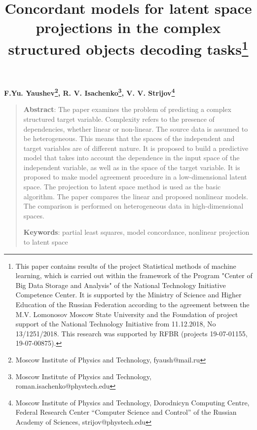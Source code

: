 \documentclass[12pt]{article}
\begin{document}
 
\title{Concordant models for latent space projections in the complex structured objects decoding tasks\thanks{This paper contains results of the project Statistical methods of machine learning, which is carried out within the framework of the Program "Center of Big Data Storage and Analysis" of the National Technology Initiative Competence Center. It is supported by the Ministry of Science and Higher Education of the Russian Federation according to the agreement between the M.V. Lomonosov Moscow State University and the Foundation of project support of the National Technology Initiative from 11.12.2018, No 13/1251/2018. This research was supported by RFBR (projects  19-07-01155, 19-07-00875).}}
\date{}
\maketitle

\begin{center}
\bf
F.Yu. Yaushev\footnote{Moscow Institute of Physics and Technology, fyaush@mail.ru},
R. V. Isachenko\footnote{Moscow Institute of Physics and Technology, roman.isachenko@phystech.edu},
V. V. Strijov\footnote{Moscow Institute of Physics and Technology, Dorodnicyn Computing Centre, Federal Research Center “Computer Science and Control” of the Russian Academy of Sciences, strijov@phystech.edu}
\end{center}

{\centering\begin{quote}
\textbf{Abstract}: 
The paper examines the problem of predicting a complex structured target variable. 
Complexity refers to the presence of dependencies, whether linear or non-linear. 
The source data is assumed to be heterogeneous.
This means that the spaces of the independent and target variables are of different nature. 
It is proposed to build a predictive model that takes into account the dependence in the input space of the independent variable, as well as in the space of the target variable. 
It is proposed to make model agreement procedure in a low-dimensional latent space. 
The projection to latent space method is used as the basic algorithm. 
The paper compares the linear and proposed nonlinear models. 
The comparison is performed on heterogeneous data in high-dimensional spaces.

	
\smallskip
\textbf{Keywords}: partial least squares, model concordance, nonlinear projection to latent space
\end{quote}
}
\end{document}
